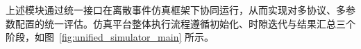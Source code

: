 上述模块通过统一接口在离散事件仿真框架下协同运行，从而实现对多协议、多参数配置的统一评估。仿真平台整体执行流程遵循初始化、时隙迭代与结果汇总三个阶段，如图~\ref{fig:unified_simulator_main} 所示。



	

		
		
		
		

